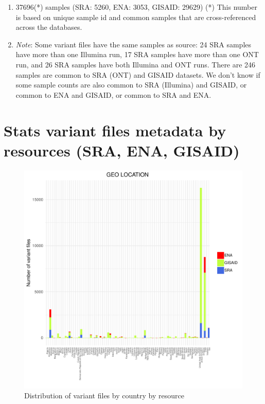 \documentclass[a4paper, 10pt]{article}        %
\begin{document}
\begin{enumerate}



\item 37696(*) samples  (SRA: 5260, ENA: 3053, GISAID: 29629) %
(*) This number is based on unique sample id and common samples that are cross-referenced across the databases.  
\item[] \textsl{Note}: Some variant files have the same samples  as source: 24 SRA samples have more than one Illumina run, 17 SRA samples have more than one ONT run, and 26 SRA samples have both Illumina and ONT runs. There are 246 samples are common to SRA (ONT) and GISAID datasets. We don't know if some sample counts are also common to SRA (Illumina) and GISAID, or common to ENA and GISAID,  or common to SRA and ENA.



 \end{enumerate}
 
 \newpage
\section{Stats variant files metadata by resources (SRA, ENA, GISAID)}


   \begin{figure}[!htb]
     \centering
       \includegraphics[width=1\textwidth]{all_loc_res.pdf}
     \caption{Distribution of variant files by country by resource}
     \label{fig:illu}
 \end{figure}
\end{document}
